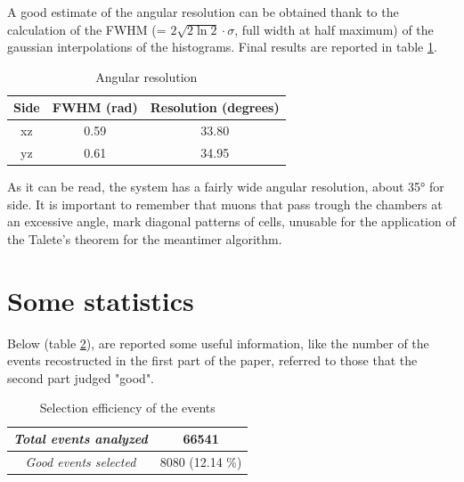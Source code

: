\documentclass[a4paper,11pt]{book}
\begin{document}
A good estimate of the angular resolution can be obtained thank to the calculation of the FWHM (= $2\sqrt{2\ln 2}\cdot\sigma$, full width at half maximum) of the gaussian interpolations of the histograms. Final results are reported in table \ref{tab:angular_resolution}.
\begin{table}[hbtp]
\centering
\begin{tabular}{c c c}
\toprule
\textbf{Side} & \textbf{FWHM (rad)} & \textbf{Resolution (degrees)}\\
\midrule
xz & 0.59 & 33.80\\
yz & 0.61 & 34.95\\
\bottomrule
\end{tabular}
\caption{Angular resolution}
\label{tab:angular_resolution}
\end{table}

As it can be read, the system has a fairly wide angular resolution, about 35° for side. It is important to remember that muons that pass trough the chambers at an excessive angle, mark diagonal patterns of cells, unusable for the application of the Talete's theorem for the meantimer algorithm.\\


\section{Some statistics}

Below (table \ref{tab:stats}), are reported some useful information, like the number of the events recostructed in the first part of the paper, referred to those that the second part judged "good".\\

\begin{table}[htbp] 
\centering
\begin{tabular}{c|c}
\toprule
\textit{Total events analyzed} & 66541\\
\midrule
\textit{Good events selected} & 8080 (12.14 \%)\\
\bottomrule
\end{tabular}
\caption{Selection efficiency of the events}
\label{tab:stats}
\end{table}
\end{document}
